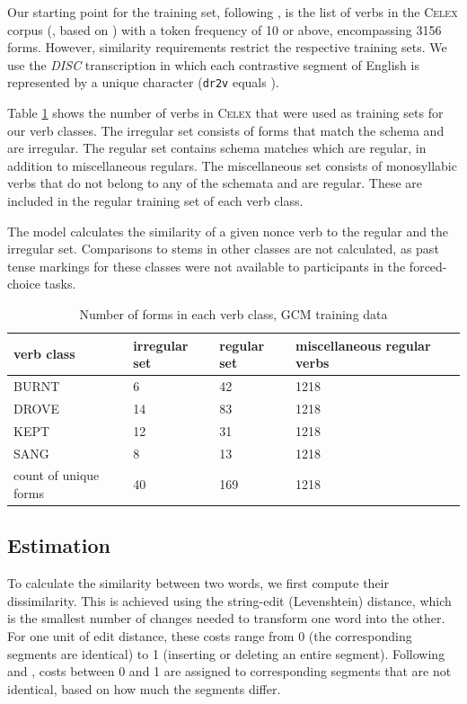 \documentclass[12pt]{article}
\begin{document}
Our starting point for the training set, following \cite{albright2003rules}, is the list of verbs in the \textsc{Celex} corpus (\citealt{baayen1993celex}, based on \citealt{sinclair1987}) with a token frequency of 10 or above, encompassing 3156 forms. However, similarity requirements restrict the respective training sets. We use the {\em DISC} transcription in which each contrastive segment of English is represented by a unique character (\texttt{dr2v} equals \textipa{[draIv]}).

Table \ref{gcmsetsize} shows the number of verbs in \textsc{Celex} that were used as training sets for our verb classes. The irregular set consists of forms that match the schema and are irregular. The regular set contains schema matches which are regular, in addition to miscellaneous regulars. The miscellaneous set consists of monosyllabic verbs that do not belong to any of the schemata and are regular. These are included in the regular training set of each verb class. 

The model calculates the similarity of a given nonce verb to the regular and the irregular set. Comparisons to stems in other classes are not calculated, as past tense markings for these classes were not available to participants in the forced-choice tasks.

\begin{table}[ht]
\centering
\begin{tabular}{llll}
  \hline
verb class & irregular set & regular set & miscellaneous regular verbs \\ 
  \hline
BURNT & 6 & 42 & 1218 \\ 
  DROVE & 14 & 83 & 1218 \\ 
  KEPT & 12 & 31 & 1218 \\ 
  SANG & 8 & 13 & 1218 \\ 
  count of unique forms & 40 & 169 & 1218 \\ 
   \hline
\end{tabular}
\caption{Number of forms in each verb class, GCM training data} 
\label{gcmsetsize}
\end{table}
\subsection{Estimation}

To calculate the similarity between two words, we first compute their dissimilarity. This is achieved using the string-edit (Levenshtein) distance, which is the smallest number of changes needed to transform one word into the other. For one unit of edit distance, these costs range from 0 (the corresponding segments are identical) to 1 (inserting or deleting an entire segment). Following \cite{albright2003rules} and \cite{dawdy2014learnability}, costs between 0 and 1 are assigned to corresponding segments that are not identical, based on how much the segments differ. 
\end{document}
